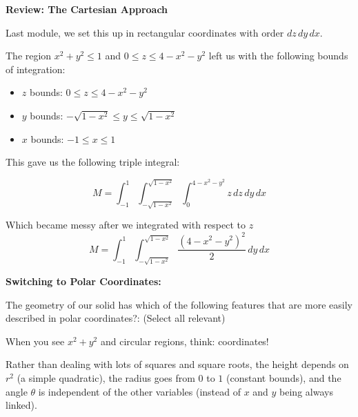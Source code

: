 \documentclass{ximera}
\begin{document}
\begin{problem}
\textbf{Review: The Cartesian Approach}

Last module, we set this up in rectangular coordinates with order $dz\,dy\,dx$.

The region $x^2 + y^2 \leq 1$ and $0 \leq z \leq 4-x^2-y^2$ left us with the following bounds of integration:

\begin{itemize}
    \item $z$ bounds: $0 \leq z \leq 4-x^2-y^2$
    \item $y$ bounds: $-\sqrt{1-x^2} \leq y \leq \sqrt{1-x^2}$
    \item $x$ bounds: $-1 \leq x \leq 1$
\end{itemize}

This gave us the following triple integral:

$$M = \int_{-1}^{1} \int_{-\sqrt{1-x^2}}^{\sqrt{1-x^2}} \int_0^{4-x^2-y^2} z\,dz\,dy\,dx$$

Which became messy after we integrated with respect to $z$
$$M = \int_{-1}^{1} \int_{-\sqrt{1-x^2}}^{\sqrt{1-x^2}} \frac{(4-x^2-y^2)^2}{2}\,dy\,dx$$


\textbf{Switching to Polar Coordinates:}

The geometry of our solid has which of the following features that are more easily described in polar coordinates?: (Select all relevant)

\begin{selectAll}
\end{selectAll}

When you see $x^2 + y^2$ and circular regions, think:  coordinates!

Rather than dealing with lots of squares and square roots, the height depends on $r^2$ (a simple quadratic), the radius goes from $0$ to $1$ (constant bounds), and the angle $\theta$ is independent of the other variables (instead of $x$ and $y$ being always linked).

\begin{center}
\end{center}
\end{problem}
\end{document}
